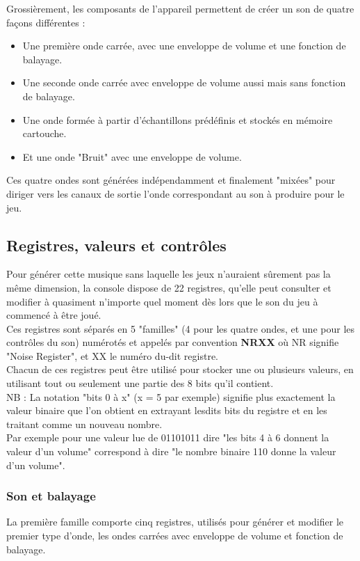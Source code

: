 \documentclass{report}
\begin{document}
	Grossièrement, les composants de l'appareil permettent de
	créer un son de quatre façons différentes : 
		\begin{itemize}
		\item Une première onde carrée, avec une enveloppe de
		volume et une fonction de balayage.
		\item Une seconde onde carrée avec enveloppe de volume
		aussi mais sans fonction de balayage.
		\item Une onde formée à partir d'échantillons
		prédéfinis et stockés en mémoire cartouche.
		\item Et une onde "Bruit" avec une enveloppe de
		volume.
		\end{itemize}
	Ces quatre ondes sont générées indépendamment et finalement
	"mixées" pour diriger vers les canaux de sortie l'onde
	correspondant au son à produire pour le jeu.

\subsection{Registres, valeurs et contrôles} 
	Pour générer cette musique sans laquelle les jeux n'auraient
	sûrement pas la même dimension, la console dispose de 22
	registres, qu'elle peut consulter et modifier à quasiment
	n'importe quel moment dès lors que le son du jeu à commencé à
	être joué.\\
	Ces registres sont séparés en 5 "familles" (4 pour les quatre
	ondes, et une pour les contrôles du son) numérotés et appelés
	par convention \textbf{NRXX} où NR signifie "Noise Register", et XX le
	numéro du-dit registre. \\
	Chacun de ces registres peut être utilisé pour stocker une
	ou plusieurs valeurs, en utilisant tout ou seulement une
	partie des 8 bits qu'il contient.\\

	NB : La notation "bits 0 à x" (x = 5 par exemple) signifie
	plus exactement la valeur binaire que l'on obtient en
	extrayant lesdits bits du registre et en les traitant comme un
	nouveau nombre.\\
	Par exemple pour une valeur lue de 01101011 dire "les bits 4 à
	6 donnent la valeur d'un volume" correspond à dire "le nombre binaire
	110 donne la valeur d'un volume".

	\subsubsection{Son et balayage}
	La première famille comporte cinq registres, utilisés pour
	générer et modifier le premier type d'onde, les ondes carrées
	avec enveloppe de volume et fonction de balayage.\\
\end{document}
